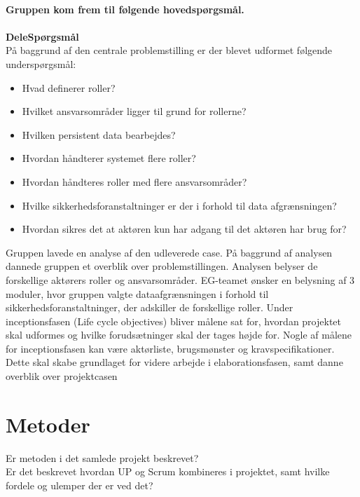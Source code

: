 \textbf{\\Gruppen kom frem til følgende hovedspørgsmål.}\\
\noindent{}
 \textbf{\\DeleSpørgsmål\\}
På baggrund af den centrale problemstilling er der blevet udformet følgende underspørgsmål:\\
\begin{itemize}
\item Hvad definerer roller?
\item Hvilket ansvarsområder ligger til grund for rollerne?
\item Hvilken persistent data bearbejdes?
\item Hvordan håndterer systemet flere roller?
\item Hvordan håndteres roller med flere ansvarsområder?
\item Hvilke sikkerhedsforanstaltninger er der i forhold til data afgrænsningen?
\item Hvordan sikres det at aktøren kun har adgang til det aktøren har brug for? 
\end{itemize}
Gruppen lavede en analyse af den udleverede case. På baggrund af analysen dannede gruppen et overblik over problemstillingen. Analysen belyser de forskellige aktørers roller og ansvarsområder. EG-teamet ønsker en belysning af 3 moduler, hvor gruppen valgte dataafgrænsningen i forhold til sikkerhedsforanstaltninger, der adskiller de forskellige roller. 
Under inceptionsfasen (Life cycle objectives) bliver målene sat for, hvordan projektet skal udformes og hvilke forudsætninger skal der tages højde for. Nogle af målene for inceptionsfasen kan være aktørliste, brugsmønster og kravspecifikationer. 
Dette skal skabe grundlaget for videre arbejde i elaborationsfasen, samt danne overblik over projektcasen



\section{Metoder}
Er metoden i det samlede projekt beskrevet?\\
Er det beskrevet hvordan UP og Scrum kombineres i projektet, samt hvilke fordele og ulemper der er ved det?\\

